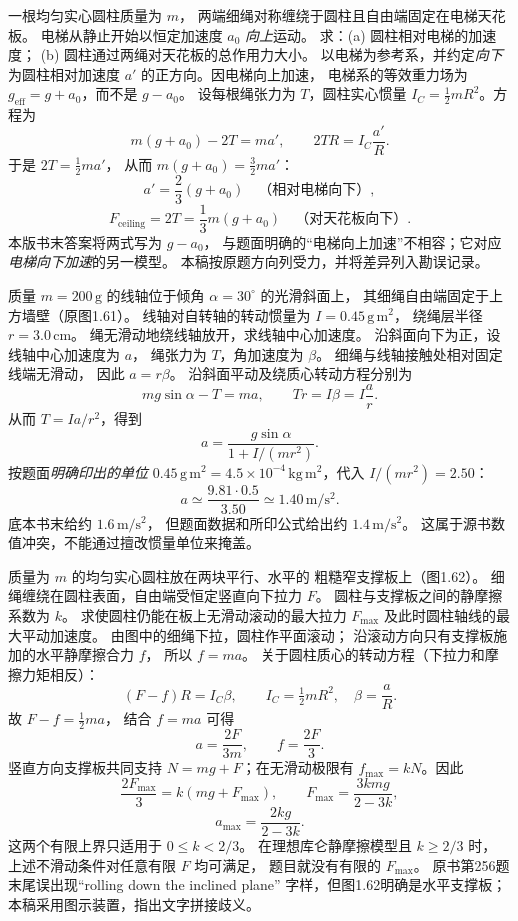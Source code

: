 一根均匀实心圆柱质量为 $m$，
两端细绳对称缠绕于圆柱且自由端固定在电梯天花板。
电梯从静止开始以恒定加速度 $a_0$ \emph{向上}运动。
求：(a) 圆柱相对电梯的加速度；
(b) 圆柱通过两绳对天花板的总作用力大小。
\exsolution
以电梯为参考系，并约定\emph{向下}为圆柱相对加速度
$a'$ 的正方向。因电梯向上加速，
电梯系的等效重力场为
$g_{\mathrm{eff}}=g+a_0$，而不是 $g-a_0$。
设每根绳张力为 $T$，圆柱实心惯量
$I_C=\frac12mR^2$。方程为
\[
m(g+a_0)-2T=ma',\qquad
2TR=I_C\frac{a'}R.
\]
于是 $2T=\frac12ma'$，
从而 $m(g+a_0)=\frac32ma'$：
\[
\boxed{a'=\frac23(g+a_0)\quad\text{（相对电梯向下）}},
\]
\[
\boxed{F_{\mathrm{ceiling}}=2T=\frac13m(g+a_0)
\quad\text{（对天花板向下）}}.
\]
\excheck 本版书末答案将两式写为 $g-a_0$，
与题面明确的“电梯向上加速”不相容；它对应
\emph{电梯向下加速}的另一模型。
本稿按原题方向列受力，并将差异列入勘误记录。

质量 $m=200\,\mathrm g$ 的线轴位于倾角
$\alpha=30^\circ$ 的光滑斜面上，
其细绳自由端固定于上方墙壁（原图1.61）。
线轴对自转轴的转动惯量为
$I=0.45\,\mathrm{g\,m^2}$，
绕绳层半径 $r=3.0\,\mathrm{cm}$。
绳无滑动地绕线轴放开，求线轴中心加速度。
\exsolution
沿斜面向下为正，设线轴中心加速度为 $a$，
绳张力为 $T$，角加速度为 $\beta$。
细绳与线轴接触处相对固定线端无滑动，
因此 $a=r\beta$。
沿斜面平动及绕质心转动方程分别为
\[
mg\sin\alpha-T=ma,\qquad
Tr=I\beta=I\frac ar.
\]
从而 $T=Ia/r^2$，得到
\[
\boxed{a=\frac{g\sin\alpha}{1+I/(mr^2)}}.
\]
按题面\emph{明确印出的单位}
$0.45\,\mathrm{g\,m^2}=4.5\times10^{-4}
\,\mathrm{kg\,m^2}$，代入
$I/(mr^2)=2.50$：
\[
\boxed{a\simeq\frac{9.81\cdot0.5}{3.50}
\simeq1.40\,\mathrm{m/s^2}}.
\]
\excheck 底本书末给约 $1.6\,\mathrm{m/s^2}$，
但题面数据和所印公式给出约 $1.4\,\mathrm{m/s^2}$。
这属于源书数值冲突，不能通过擅改惯量单位来掩盖。

质量为 $m$ 的均匀实心圆柱放在两块平行、水平的
粗糙窄支撑板上（图1.62）。
细绳缠绕在圆柱表面，自由端受恒定竖直向下拉力 $F$。
圆柱与支撑板之间的静摩擦系数为 $k$。
求使圆柱仍能在板上无滑动滚动的最大拉力
$F_{\max}$ 及此时圆柱轴线的最大平动加速度。
\exsolution
由图中的细绳下拉，圆柱作平面滚动；
沿滚动方向只有支撑板施加的水平静摩擦合力 $f$，
所以 $f=ma$。
关于圆柱质心的转动方程（下拉力和摩擦力矩相反）：
\[
(F-f)R=I_C\beta,\qquad
I_C=\tfrac12mR^2,\quad \beta=\frac aR.
\]
故 $F-f=\frac12ma$，
结合 $f=ma$ 可得
\[
\boxed{a=\frac{2F}{3m}},\qquad
f=\frac{2F}{3}.
\]
竖直方向支撑板共同支持
$N=mg+F$；在无滑动极限有
$f_{\max}=kN$。因此
\[
\frac{2F_{\max}}{3}=k(mg+F_{\max}),
\qquad
\boxed{F_{\max}=\frac{3kmg}{2-3k}},
\]
\[
\boxed{a_{\max}=\frac{2kg}{2-3k}}.
\]
\excheck 这两个有限上界只适用于 $0\le k<2/3$。
在理想库仑静摩擦模型且 $k\ge2/3$ 时，
上述不滑动条件对任意有限 $F$ 均可满足，
题目就没有有限的 $F_{\max}$。
原书第256题末尾误出现“rolling down the inclined plane”
字样，但图1.62明确是水平支撑板；
本稿采用图示装置，指出文字拼接歧义。


